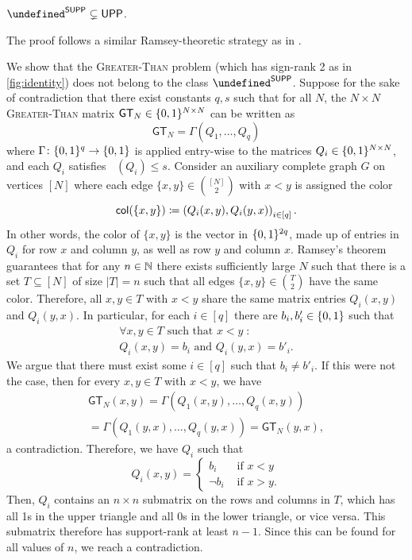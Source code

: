 \documentclass[conference]{IEEEtran}
\DeclareMathOperator{\suprank}{rank_0}
\newcommand{\cplxclass}[1]{\mathsf{#1}}
\let\P\undefined\DeclareMathOperator{\P}{\cplxclass{P}}
\DeclareMathOperator{\UPP}{\cplxclass{UPP}}
\DeclareMathOperator{\SUPP}{\cplxclass{SUPP}}
\newcommand{\GEQ}{\mathsf{GT}}
\begin{document}
\begin{proposition}\label{prop:psup-nin-upp}
    $\P^{\SUPP} \subsetneq \UPP$.
\end{proposition}
The proof follows a similar Ramsey-theoretic strategy as in \cite{FHHH24}.
\begin{IEEEproof}
We show that the \textsc{Greater-Than} problem (which has sign-rank 2 as in
\cref{fig:identity}) does not belong to the class $\P^{\SUPP}$. Suppose for the sake of contradiction
that there exist constants $q, s$ such that for all $N$, the $N \times N$ \textsc{Greater-Than}
matrix $\GEQ_N \in \zo^{N \times N}$ can be written as
\[
    \GEQ_N = \Gamma( Q_1, \dotsc, Q_q )
\]
where $\Gamma \colon \{0,1\}^q \to \{0,1\}$ is applied entry-wise to the matrices $Q_i
\in \{0,1\}^{N \times N}$, and each $Q_i$ satisfies $\suprank(Q_i) \leq s$. Consider an
auxiliary complete graph $G$ on vertices $[N]$ where each edge $\{x,y\} \in
\binom{[N]}{2}$ with $x < y$ is assigned the color
\[
    \mathsf{col}(\{x,y\}) \coloneqq \left( Q_i(x,y), Q_i(y,x) \right)_{i \in [q]} .
\]
In other words, the color of $\{x,y\}$ is the vector in $\{0,1\}^{2q}$, made up of entries in
$Q_i$ for row $x$ and column $y$, as well as row $y$ and column $x$. Ramsey's
theorem guarantees that for any $n \in \mathbb{N}$ there exists sufficiently large $N$
such that there is a set $T \subseteq [N]$ of size $|T| = n$ such that all edges
$\{x,y\} \in \binom{T}{2}$ have the same color. Therefore, all $x,y \in T$ with
$x < y$ share the same matrix entries $Q_i(x,y)$ and $Q_i(y,x)$. In particular,
for each $i \in [q]$ there are $b_i, b'_i \in \{0,1\}$ such that
\begin{align*}
    \forall x,y \in T \text{ such that } x < y \;\colon\\
    Q_i(x,y) = b_i \text{ and } Q_i(y,x) = b'_i .
\end{align*}
We argue that there must exist some $i \in [q]$ such that $b_i \neq b'_i$. If this were
not the case, then for every $x,y \in T$ with $x < y$, we have
\begin{align*}
    \GEQ_N(x,y) = \Gamma(Q_1(x,y), \dotsc, Q_q(x,y))\\
    = \Gamma(Q_1(y,x), \dotsc, Q_q(y,x)) = \GEQ_N(y,x) ,
\end{align*}
a contradiction. Therefore, we have $Q_i$ such that
\[
Q_i(x,y) = \begin{cases}
    b_i &\text{ if } x < y \\
    \neg b_i &\text{ if } x > y .
\end{cases}
\]
Then, $Q_i$ contains an $n \times n$ submatrix on the rows and columns in $T$,
which has all 1s in the upper triangle and all 0s in
the lower triangle, or vice versa. This submatrix therefore has support-rank at least $n-1$.
Since this can be found for all values of $n$, we reach a contradiction.
\end{IEEEproof}
\end{document}
